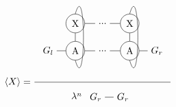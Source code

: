\begin{equation}
    \Braket{X} = \frac{
        \begin{tikzpicture} [   ]
            \clip (-0.5,-1) rectangle (4.5,2);

            \node[] (N1) at (0,0) {$G_l$};
            \node[circle, draw] (N2) at (1,0) {A};
            \node[circle, draw] (X2) at (1,1) {X};

            \node[] (N3) at (2 ,0) {...};
            \node[] (X3) at (2,1) {...};

            \node[circle, draw] (N4) at (3 ,0) {A};
            \node[circle, draw] (X4) at (3,1) {X};

            \node[] (N5) at (4 ,0) {$G_r$};

            \draw  (N1) -- (N2) ;
            \draw  (N2) -- (N3) ;
            \draw  (N3) -- (N4) ;
            \draw  (N4) -- (N5) ;

            \draw  (X2) -- (X3) ;
            \draw  (X3) -- (X4) ;

            \draw  (N2) -- (X2) ;
            \draw  (N4) -- (X4) ;

            \draw (X2.north)   .. controls +(0.4,1.4) and +(0.4,-1.4) .. (N2.south);
            \draw (X4.north)   .. controls +(0.4,1.4) and +(0.4,-1.4) .. (N4.south);

        \end{tikzpicture}
    }{
        \lambda^n
        \begin{tikzpicture}[baseline={0cm-0.5*height("$=$")} ]
            \clip (-0.5,-0.5) rectangle (1.4,0.5);
            \node[] (N2) at (1,0) {$G_r$};
            \node[] (N1) at (0,0) {$G_r$};
            \draw  (N1) -- (N2) ;
        \end{tikzpicture}
    }
    \label{sm:expecatation_X_2}
\end{equation}

